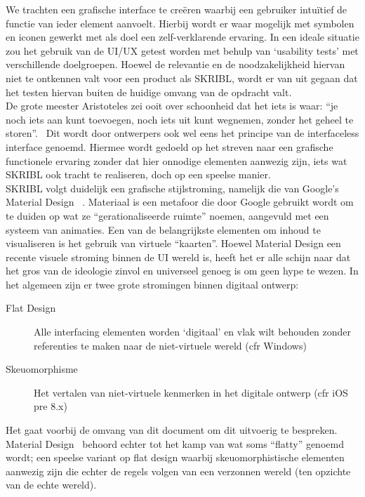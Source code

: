 \documentclass{article}
\begin{document}
We trachten een grafische interface te creëren waarbij een gebruiker intuïtief de functie van ieder element aanvoelt. Hierbij wordt er waar mogelijk met symbolen en iconen gewerkt met als doel een zelf-verklarende ervaring. In een ideale situatie zou het gebruik van de UI/UX getest worden met behulp van `usability tests' met verschillende doelgroepen. Hoewel de relevantie en de noodzakelijkheid hiervan niet te ontkennen valt voor een product als SKRIBL, wordt er van uit gegaan dat het testen hiervan buiten de huidige omvang van de opdracht valt.
\\

De grote meester Aristoteles zei ooit over schoonheid dat het iets is waar: “je noch iets aan kunt toevoegen, noch iets uit kunt wegnemen, zonder het geheel te storen”.~\cite{gadamer} Dit wordt door ontwerpers ook wel eens het principe van de interfaceless interface genoemd. Hiermee wordt gedoeld op het streven naar een grafische functionele ervaring zonder dat hier onnodige elementen aanwezig zijn, iets wat SKRIBL ook tracht te realiseren, doch op een speelse manier. 
\\

SKRIBL volgt duidelijk een grafische stijlstroming, namelijk die van Google’s Material Design ~\cite{website:Material}. Materiaal is een metafoor die door Google gebruikt wordt om te duiden op wat ze “gerationaliseerde ruimte” noemen, aangevuld met een systeem van animaties. Een van de belangrijkste elementen om inhoud te visualiseren is het gebruik van virtuele “kaarten”. Hoewel Material Design een recente visuele stroming binnen de UI wereld is, heeft het er alle schijn naar dat het gros van de ideologie zinvol en universeel genoeg is om geen hype te wezen. In het algemeen zijn er twee grote stromingen binnen digitaal ontwerp:

\begin{description}

\item[Flat Design] Alle interfacing elementen worden `digitaal' en vlak wilt behouden zonder referenties te maken naar de niet-virtuele wereld (cfr Windows)

\item[Skeuomorphisme] Het vertalen van niet-virtuele kenmerken in het digitale ontwerp (cfr iOS pre 8.x)

\end{description}

Het gaat voorbij de omvang van dit document om dit uitvoerig te bespreken. Material Design~\cite{website:Material} behoord echter tot het kamp van wat soms “flatty” genoemd wordt; een speelse variant op flat design waarbij skeuomorphistische elementen aanwezig zijn die echter de regels volgen van een verzonnen wereld (ten opzichte van de echte wereld).
\\
\end{document}
